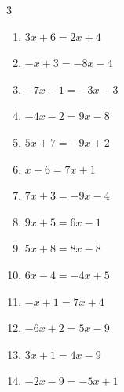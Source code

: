 \begin{multicols}{3}
\begin{enumerate}
        \phantom{$\displaystyle x=-4$}

  \item $3x+6=2x+4$

        \phantom{$\displaystyle x=-2$}

  \item $-x+3=-8x-4$

        \phantom{$\displaystyle x=-1$}

  \item $-7x-1=-3x-3$


  \item $-4x-2=9x-8$


  \item $5x+7=-9x+2$


  \item $x-6=7x+1$


  \item $7x+3=-9x-4$


  \item $9x+5=6x-1$

        \phantom{$\displaystyle x=-2$}

  \item $5x+8=8x-8$


  \item $6x-4=-4x+5$


  \item $-x+1=7x+4$


  \item $-6x+2=5x-9$

        \phantom{$\displaystyle x=1$}

\columnbreak %

  \item $3x+1=4x-9$

        \phantom{$\displaystyle x=10$}

  \item $-2x-9=-5x+1$


\end{enumerate}
\end{multicols}
